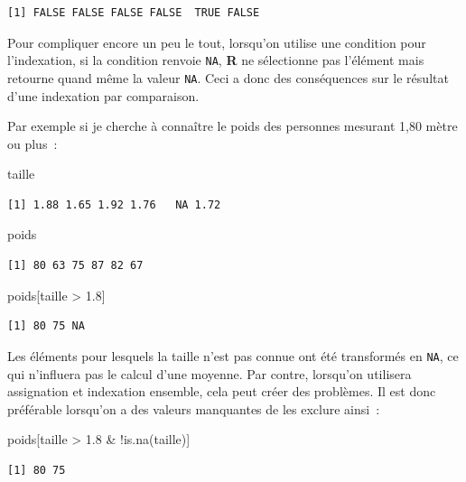 \documentclass[
  letterpaper,
  DIV=11,
  numbers=noendperiod,
  oneside]{scrreprt}
\newenvironment{Shaded}{\begin{snugshade}}{\end{snugshade}}
\newcommand{\FloatTok}[1]{\textcolor[rgb]{0.68,0.00,0.00}{#1}}
\newcommand{\FunctionTok}[1]{\textcolor[rgb]{0.28,0.35,0.67}{#1}}
\newcommand{\NormalTok}[1]{\textcolor[rgb]{0.00,0.23,0.31}{#1}}
\newcommand{\SpecialCharTok}[1]{\textcolor[rgb]{0.37,0.37,0.37}{#1}}
\begin{document}
\begin{tcolorbox}
\begin{verbatim}
[1] FALSE FALSE FALSE FALSE  TRUE FALSE
\end{verbatim}

Pour compliquer encore un peu le tout, lorsqu'on utilise une condition
pour l'indexation, si la condition renvoie \texttt{NA}, \textbf{R} ne
sélectionne pas l'élément mais retourne quand même la valeur
\texttt{NA}. Ceci a donc des conséquences sur le résultat d'une
indexation par comparaison.

Par exemple si je cherche à connaître le poids des personnes mesurant
1,80 mètre ou plus~:

\begin{Shaded}
\begin{Highlighting}[]
\NormalTok{taille}
\end{Highlighting}
\end{Shaded}

\begin{verbatim}
[1] 1.88 1.65 1.92 1.76   NA 1.72
\end{verbatim}

\begin{Shaded}
\begin{Highlighting}[]
\NormalTok{poids}
\end{Highlighting}
\end{Shaded}

\begin{verbatim}
[1] 80 63 75 87 82 67
\end{verbatim}

\begin{Shaded}
\begin{Highlighting}[]
\NormalTok{poids[taille }\SpecialCharTok{\textgreater{}} \FloatTok{1.8}\NormalTok{]}
\end{Highlighting}
\end{Shaded}

\begin{verbatim}
[1] 80 75 NA
\end{verbatim}

Les éléments pour lesquels la taille n'est pas connue ont été
transformés en \texttt{NA}, ce qui n'influera pas le calcul d'une
moyenne. Par contre, lorsqu'on utilisera assignation et indexation
ensemble, cela peut créer des problèmes. Il est donc préférable
lorsqu'on a des valeurs manquantes de les exclure ainsi~:

\begin{Shaded}
\begin{Highlighting}[]
\NormalTok{poids[taille }\SpecialCharTok{\textgreater{}} \FloatTok{1.8} \SpecialCharTok{\&} \SpecialCharTok{!}\FunctionTok{is.na}\NormalTok{(taille)]}
\end{Highlighting}
\end{Shaded}

\begin{verbatim}
[1] 80 75
\end{verbatim}

\end{tcolorbox}
\end{document}
